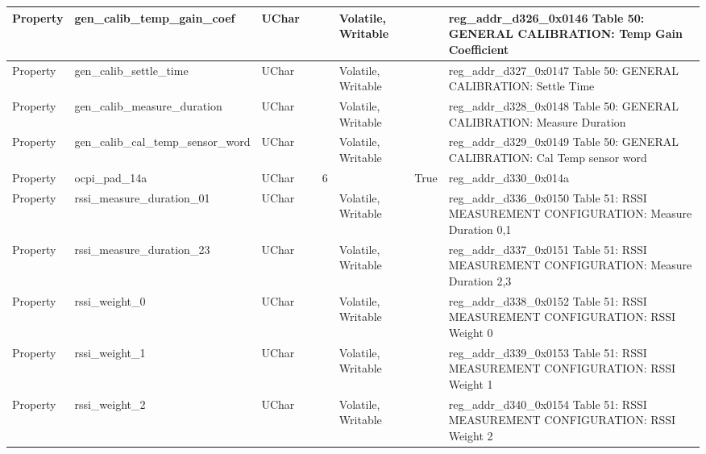 \documentclass{article}
\begin{document}
\begin{scriptsize}
\begin{longtable}{|p{2cm}|p{5cm}|p{1cm}|p{2cm}|p{2cm}|p{1.75cm}|p{1.5cm}|p{5.1cm}|}
  \hline
  Property & gen\_calib\_temp\_gain\_coef                             & UChar &                  &                  & Volatile,  Writable &         & reg\_addr\_d326\_0x0146 Table 50: GENERAL CALIBRATION: Temp Gain Coefficient \\
  \hline
  Property & gen\_calib\_settle\_time                                 & UChar &                  &                  & Volatile,  Writable &         & reg\_addr\_d327\_0x0147 Table 50: GENERAL CALIBRATION: Settle Time \\
  \hline
  Property & gen\_calib\_measure\_duration                            & UChar &                  &                  & Volatile,  Writable &         & reg\_addr\_d328\_0x0148 Table 50: GENERAL CALIBRATION: Measure Duration \\
  \hline
  Property & gen\_calib\_cal\_temp\_sensor\_word                      & UChar &                  &                  & Volatile,  Writable &         & reg\_addr\_d329\_0x0149 Table 50: GENERAL CALIBRATION: Cal Temp sensor word \\
  \hline
  Property & ocpi\_pad\_14a                                           & UChar &                  & 6                &                     & True    & reg\_addr\_d330\_0x014a \\
  \hline
  Property & rssi\_measure\_duration\_01                              & UChar &                  &                  & Volatile,  Writable &         & reg\_addr\_d336\_0x0150 Table 51: RSSI MEASUREMENT CONFIGURATION: Measure Duration 0,1 \\
  \hline
  Property & rssi\_measure\_duration\_23                              & UChar &                  &                  & Volatile,  Writable &         & reg\_addr\_d337\_0x0151 Table 51: RSSI MEASUREMENT CONFIGURATION: Measure Duration 2,3 \\
  \hline
  Property & rssi\_weight\_0                                          & UChar &                  &                  & Volatile,  Writable &         & reg\_addr\_d338\_0x0152 Table 51: RSSI MEASUREMENT CONFIGURATION: RSSI Weight 0 \\
  \hline
  Property & rssi\_weight\_1                                          & UChar &                  &                  & Volatile,  Writable &         & reg\_addr\_d339\_0x0153 Table 51: RSSI MEASUREMENT CONFIGURATION: RSSI Weight 1 \\
  \hline
  Property & rssi\_weight\_2                                          & UChar &                  &                  & Volatile,  Writable &         & reg\_addr\_d340\_0x0154 Table 51: RSSI MEASUREMENT CONFIGURATION: RSSI Weight 2 \\

\end{longtable}
\end{scriptsize}
\end{document}
